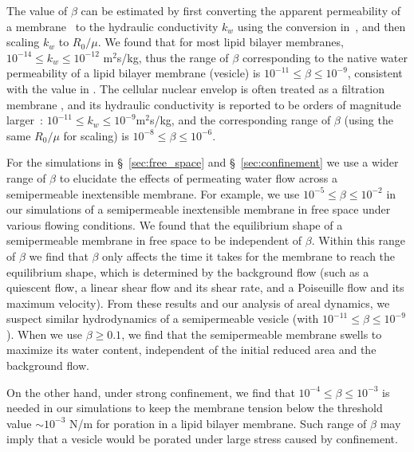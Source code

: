 \documentclass[prb,preprint,showpacs,preprintnumbers,amsmath,amssymb,longbibliography]{revtex4-1}
\begin{document}
The value of $\beta$ can be estimated by first
converting the apparent permeability of a 
membrane~\cite{OlbrichRawiczNeedhamEtAl2000_BJ} to the hydraulic
conductivity $k_w$ using the conversion
in~\citet{FettiplaceHaydon1980_PhysRev}, and then scaling $k_w$ to $R_0/\mu$. We found that for most lipid bilayer membranes, $10^{-14}\le
k_w\le 10^{-12}$ m$^2$s/kg, thus the range of $\beta$ corresponding to the native water permeability of a lipid bilayer membrane (vesicle) is $10^{-11}\le
\beta\le 10^{-9}$, consistent with the value in \citet{vogl2014effect}. 
The cellular nuclear envelop is often treated as a filtration membrane \cite{Shahin2019_AdvSci}, and 
its hydraulic conductivity is reported to be orders of magnitude larger~\cite{Wijmans1984_JMS}:
$10^{-11}\le k_w \le 10^{-9}$m$^2$s/kg,  and the corresponding range of $\beta$ (using the same $R_0/\mu$ for scaling) is $10^{-8}\le
\beta\le 10^{-6}$.





For the simulations in \S~\ref{sec:free_space} and \S~\ref{sec:confinement} we use a wider range of $\beta$ to elucidate the effects of permeating water flow across a
semipermeable inextensible membrane.
%
For example, we use $10^{-5}\le\beta\le10^{-2}$ in our simulations of a
semipermeable inextensible membrane in free space under various flowing
conditions. We found that the equilibrium shape of a semipermeable
membrane in free space to be independent of $\beta$. Within this range
of $\beta$ we find that $\beta$ only affects the time it takes for the
membrane to reach the equilibrium shape, which is determined by the
background flow (such as a quiescent flow, a linear shear flow and its
shear rate, and a Poiseuille flow and its maximum velocity). From these
results and our analysis of areal dynamics, we suspect similar
hydrodynamics of a semipermeable vesicle (with $10^{-11}\le\beta\le
10^{-9}$). 
%
When we use $\beta\ge 0.1$, we find that the semipermeable membrane swells to maximize its water content, independent of the initial reduced 
area and the background flow.
%
%

On the other hand,
under strong confinement,  we find that $10^{-4}\le\beta\le10^{-3}$ is needed in our
simulations to keep the membrane tension below the threshold value $\sim 10^{-3}$ N/m for
poration in a lipid bilayer membrane. Such range of $\beta$ may imply
that a vesicle would be porated under large stress
caused by confinement.
\end{document}
